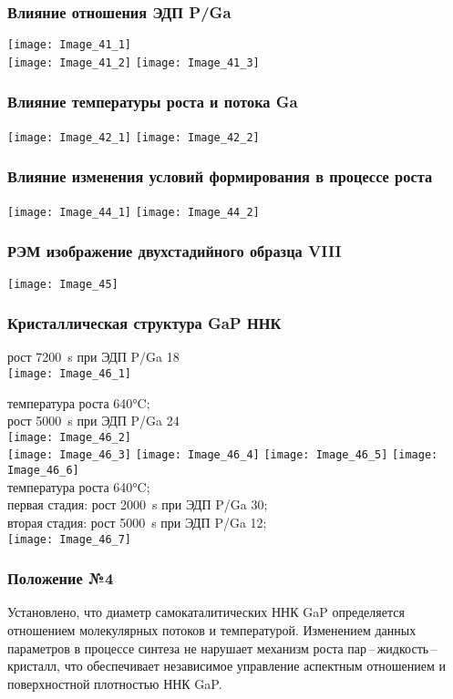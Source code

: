 \begin{frame}
	\frametitle{Влияние отношения ЭДП P/Ga}
	\centering
	\texttt{[image: Image\_41\_1]}
	\\
	\texttt{[image: Image\_41\_2]}
	\texttt{[image: Image\_41\_3]}
\end{frame}


\begin{frame}
	\frametitle{Влияние температуры роста и потока Ga}
	\centering
	\hfill
	\texttt{[image: Image\_42\_1]}
	\hfill
	\texttt{[image: Image\_42\_2]}
	\hfill
\end{frame}

\begin{frame}
	\frametitle{Влияние изменения условий формирования в процессе роста}
	\centering
	\hfill
	\texttt{[image: Image\_44\_1]}
	\hfill
	\texttt{[image: Image\_44\_2]}
	\hfill
\end{frame}

\begin{frame}
	\frametitle{РЭМ изображение двухстадийного образца VIII}
	\centering
	\texttt{[image: Image\_45]}
\end{frame}

\begin{frame}
	\frametitle{Кристаллическая структура GaP ННК}
	\centering
	рост 7200~\si{\second} при ЭДП P/Ga 18
	\\
	\texttt{[image: Image\_46\_1]}

	температура роста 640\si{\degreeCelsius};
	\\
	рост 5000~\si{\second} при ЭДП P/Ga 24
	\\
	\texttt{[image: Image\_46\_2]}
	\\
	\texttt{[image: Image\_46\_3]}
	\texttt{[image: Image\_46\_4]}
	\texttt{[image: Image\_46\_5]}
	\texttt{[image: Image\_46\_6]}
	\\
	температура роста 640\si{\degreeCelsius};
	\\
	первая стадия: рост 2000~\si{\second} при ЭДП P/Ga 30;
	\\
	вторая стадия: рост 5000~\si{\second} при ЭДП P/Ga 12;
	\\
	\texttt{[image: Image\_46\_7]}
\end{frame}

\begin{frame}
	\frametitle{Положение №4}
	\large
Установлено, что диаметр самокаталитических ННК GaP определяется
отношением молекулярных потоков и температурой. Изменением данных
параметров в процессе синтеза не нарушает механизм роста
пар\,--\,жидкость\,--\,кристалл, что обеспечивает независимое управление
аспектным отношением и поверхностной плотностью ННК GaP.
\end{frame}
